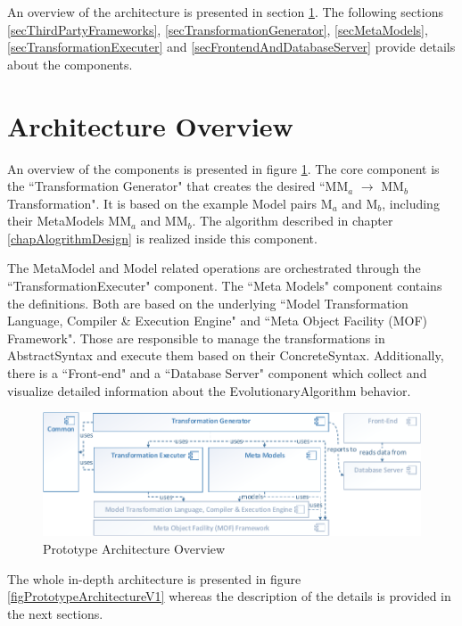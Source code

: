 An overview of the architecture is presented in section \ref{secArchitectureOverview}. The following sections \ref{secThirdPartyFrameworks}, \ref{secTransformationGenerator}, \ref{secMetaModels}, \ref{secTransformationExecuter} and \ref{secFrontendAndDatabaseServer} provide details about the components.

\section{Architecture Overview}\label{secArchitectureOverview}

An overview of the components is presented in figure \ref{figPrototypeArchitectureV1Overview}. The core component is the ``Transformation Generator" that creates the desired ``MM$_a$ $\rightarrow$ MM$_b$ Transformation". It is based on the example \gls{Model} pairs M$_a$ and M$_b$, including their \glspl{MetaModel} MM$_a$ and MM$_b$. The algorithm described in chapter \ref{chapAlogrithmDesign} is realized inside this component.

The \gls{MetaModel} and \gls{Model} related operations are orchestrated through the ``\Gls{TransformationExecuter}" component. The ``Meta Models" component contains the definitions. Both are based on the underlying ``Model Transformation Language, Compiler \& Execution Engine" and ``Meta Object Facility (MOF) Framework". Those are responsible to manage the transformations in \gls{AbstractSyntax} and execute them based on their \gls{ConcreteSyntax}. Additionally, there is a ``Front-end" and a ``Database Server" component which collect and visualize detailed information about the \gls{EvolutionaryAlgorithm} behavior. 

\begin{figure}[!ht]
	\centering
	\includegraphics[scale=0.96]{Images/PrototypeArchitectureV1Overview.pdf} 
	\caption{Prototype Architecture Overview}
	\label{figPrototypeArchitectureV1Overview}
\end{figure}

The whole in-depth architecture is presented in figure \ref{figPrototypeArchitectureV1} whereas the description of the details is provided in the next sections.


